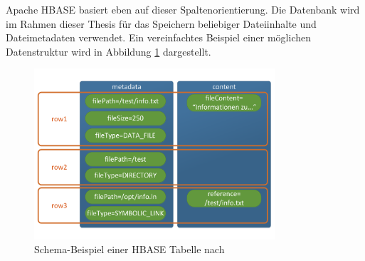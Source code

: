 \noindent
Apache HBASE basiert eben auf dieser Spaltenorientierung. Die Datenbank wird im Rahmen dieser Thesis für das Speichern beliebiger Dateiinhalte und Dateimetadaten verwendet. Ein vereinfachtes Beispiel einer möglichen Datenstruktur wird in Abbildung \ref{fig:hbase_schema_example} dargestellt.\\

\begin{figure}[ht]
  \centering
  \includegraphics[width=0.8\textwidth]{./resource/hbase_data_schema_example.pdf}
  \caption{Schema-Beispiel einer HBASE Tabelle nach \cite{big_data_praxis}}
  \label{fig:hbase_schema_example}
\end{figure}

